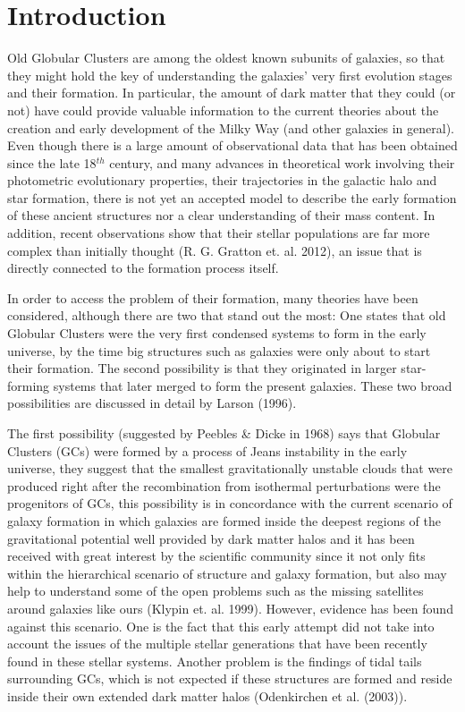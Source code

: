 \chapter{Introduction}

Old Globular Clusters are among the oldest known subunits of galaxies, so that they might hold the key of understanding the galaxies' very first evolution stages and their formation. In particular, the amount of dark matter that they could (or not) have could provide valuable information to the current theories about the creation and early development of the Milky Way (and other galaxies in general). Even though there is a large amount of observational data that has been obtained since the late 18$^{th}$ century, and many advances in theoretical work involving their photometric evolutionary properties, their trajectories in the galactic halo and star formation, there is not yet an accepted model to describe the early formation of these ancient structures nor a clear understanding of their mass content. In addition, recent observations show that their stellar populations are far more complex than initially thought (R. G. Gratton et. al. 2012), an issue that is directly connected to the formation process itself. 

In order to access the problem of their formation, many theories have been considered, although there are two that stand out the most: One states that old Globular Clusters were the very first condensed systems to form in the early universe, by the time big structures such as galaxies were only about to start their formation. The second possibility is that they originated in larger star-forming systems that later merged to form the present galaxies. These two broad possibilities are discussed in detail by Larson (1996).

The first possibility (suggested by Peebles \& Dicke in 1968) says that Globular Clusters (GCs) were formed by a process of Jeans instability in the early universe, they suggest that the smallest gravitationally unstable clouds that were produced right after the recombination from isothermal perturbations were the progenitors of GCs, this possibility is in concordance with the current scenario of galaxy formation in which galaxies are formed inside the deepest regions of the gravitational potential well provided by dark matter halos and it has been received with great interest by the scientific community since it not only fits within the hierarchical scenario of structure and galaxy formation, but also may help to understand some of the open problems such as the missing satellites around galaxies like ours (Klypin et. al. 1999). However, evidence has been found against this scenario. One is the fact that this early attempt did not take into account the issues of the multiple stellar generations that have been recently found in these stellar systems. Another problem is the findings of tidal tails surrounding GCs, which is not expected if these structures are formed and reside inside their own extended dark matter halos (Odenkirchen et al. (2003)).

